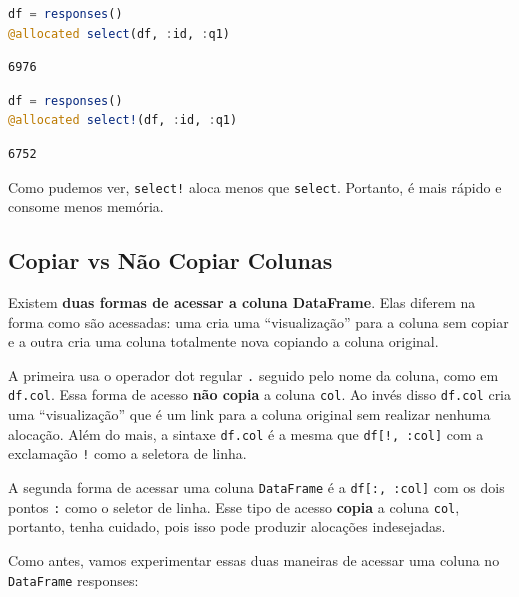 \documentclass[
  notoc %
]{tufte-book}
\newcommand{\passthrough}[1]{#1}
\begin{document}
\begin{lstlisting}[language=Julia]
df = responses()
@allocated select(df, :id, :q1)
\end{lstlisting}

\begin{lstlisting}
6976
\end{lstlisting}

\begin{lstlisting}[language=Julia]
df = responses()
@allocated select!(df, :id, :q1)
\end{lstlisting}

\begin{lstlisting}
6752
\end{lstlisting}

Como pudemos ver, \passthrough{\lstinline"select!"} aloca menos que
\passthrough{\lstinline!select!}. Portanto, é mais rápido e consome
menos memória.

\hypertarget{sec:df_performance_df_copy}{%
\subsection{Copiar vs Não Copiar
Colunas}\label{sec:df_performance_df_copy}}

Existem \textbf{duas formas de acessar a coluna DataFrame}. Elas diferem
na forma como são acessadas: uma cria uma ``visualização'' para a coluna
sem copiar e a outra cria uma coluna totalmente nova copiando a coluna
original.

A primeira usa o operador dot regular \passthrough{\lstinline!.!}
seguido pelo nome da coluna, como em \passthrough{\lstinline!df.col!}.
Essa forma de acesso \textbf{não copia} a coluna
\passthrough{\lstinline!col!}. Ao invés disso
\passthrough{\lstinline!df.col!} cria uma ``visualização'' que é um link
para a coluna original sem realizar nenhuma alocação. Além do mais, a
sintaxe \passthrough{\lstinline!df.col!} é a mesma que
\passthrough{\lstinline"df[!, :col]"} com a exclamação
\passthrough{\lstinline"!"} como a seletora de linha.

A segunda forma de acessar uma coluna
\passthrough{\lstinline!DataFrame!} é a
\passthrough{\lstinline!df[:, :col]!} com os dois pontos
\passthrough{\lstinline!:!} como o seletor de linha. Esse tipo de acesso
\textbf{copia} a coluna \passthrough{\lstinline!col!}, portanto, tenha
cuidado, pois isso pode produzir alocações indesejadas.

Como antes, vamos experimentar essas duas maneiras de acessar uma coluna
no \passthrough{\lstinline!DataFrame!} responses:
\end{document}

